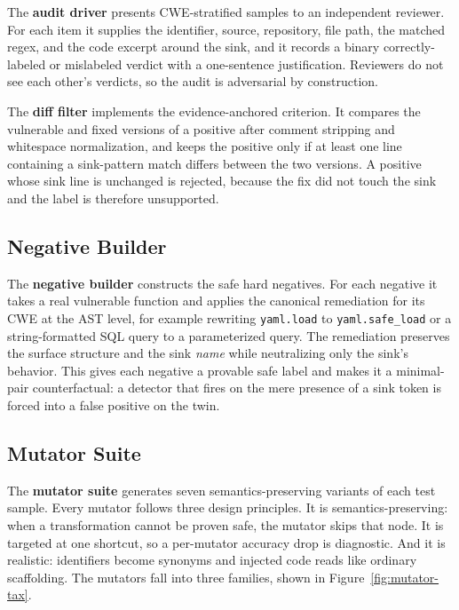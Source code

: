 The \textbf{audit driver} presents CWE-stratified samples to an independent
reviewer. For each item it supplies the identifier, source, repository, file
path, the matched regex, and the code excerpt around the sink, and it records a
binary correctly-labeled or mislabeled verdict with a one-sentence
justification. Reviewers do not see each other's verdicts, so the audit is
adversarial by construction.

The \textbf{diff filter} implements the evidence-anchored criterion. It compares
the vulnerable and fixed versions of a positive after comment stripping and
whitespace normalization, and keeps the positive only if at least one line
containing a sink-pattern match differs between the two versions. A positive
whose sink line is unchanged is rejected, because the fix did not touch the
sink and the label is therefore unsupported.

\subsection{Negative Builder}

The \textbf{negative builder} constructs the safe hard negatives. For each
negative it takes a real vulnerable function and applies the canonical
remediation for its CWE at the AST level, for example rewriting
\texttt{yaml.load} to \texttt{yaml.safe\_load} or a string-formatted SQL query
to a parameterized query. The remediation preserves the surface structure and
the sink \emph{name} while neutralizing only the sink's behavior. This gives
each negative a provable safe label and makes it a minimal-pair counterfactual:
a detector that fires on the mere presence of a sink token is forced into a
false positive on the twin.

\subsection{Mutator Suite}

The \textbf{mutator suite} generates seven semantics-preserving variants of each
test sample. Every mutator follows three design principles. It is
semantics-preserving: when a transformation cannot be proven safe, the mutator
skips that node. It is targeted at one shortcut, so a per-mutator accuracy drop
is diagnostic. And it is realistic: identifiers become synonyms and injected
code reads like ordinary scaffolding. The mutators fall into three families,
shown in Figure~\ref{fig:mutator-tax}.

